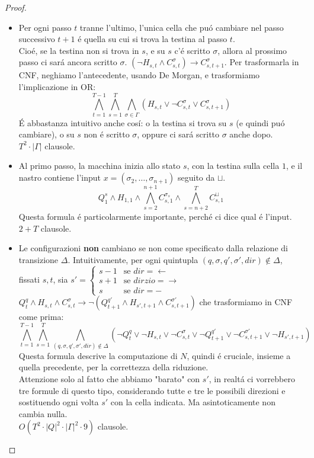 \begin{proof}
\begin{itemize}
    \item Per ogni passo $t$ tranne l'ultimo, l'unica cella che puó cambiare nel passo successivo $t+1$ é quella su cui si trova la testina al passo $t$.\\
    Cioé, se la testina non si trova in $s$, e su $s$ c'é scritto $\sigma$, allora al prossimo passo ci sará ancora scritto $\sigma$.
    $(\neg H_{s,t} \land C_{s,t}^\sigma) \rightarrow C_{s,t+1}^\sigma$. 
    Per trasformarla in CNF, neghiamo l'antecedente, usando De Morgan, e trasformiamo l'implicazione in OR:
    \[
    \bigwedge_{t=1}^{T-1} \bigwedge_{s=1}^{T} \bigwedge_{\sigma \in \Gamma} \left( H_{s,t} \lor \neg C_{s,t}^\sigma \lor C_{s,t+1}^\sigma \right)
    \]
    É abbastanza intuitivo anche cosí: o la testina si trova su $s$ (e quindi puó cambiare), o su $s$ non é scritto $\sigma$, oppure ci sará scritto $\sigma$ anche dopo.\\
    $T^2 \cdot |\Gamma|$ clausole.\\

    \item Al primo passo, la macchina inizia allo stato $s$, con la testina sulla cella $1$, e il nastro contiene l'input $x = (\sigma_2, \dots, \sigma_{n+1})$ seguito da ${\sqcup}$.
    \[
    Q_1^s \land H_{1,1} \land \bigwedge_{s=2}^{n+1} C_{s, 1}^{\sigma_{s}} \land \bigwedge_{s=n+2}^{T} C_{s, 1}^{\sqcup}
    \]
    Questa formula é particolarmente importante, perché ci dice qual é l'input.\\
    $2 + T$ clausole.\\
    
    \item Le configurazioni \textbf{non} cambiano se non come specificato dalla relazione di transizione $\Delta$.
    Intuitivamente, per ogni quintupla $(q, \sigma, q', \sigma', dir) \notin \Delta$, fissati $s, t$, sia 
    $s' = \begin{cases}
        s-1 & \text{se } dir = \leftarrow \\
        s+1 & \text{se } dir zio= \rightarrow\\
        s & \text{se } dir = -
    \end{cases}$\\
    $Q_t^q \land H_{s,t} \land C_{s,t}^\sigma \rightarrow \neg (Q_{t+1}^{q'} \land H_{s',t+1} \land  C_{s,t+1}^{\sigma'})$
    che trasformiamo in CNF come prima:
    \[
    \bigwedge_{t=1}^{T-1} \bigwedge_{s=1}^{T} \bigwedge_{(q, \sigma, q', \sigma', dir) \notin \Delta} \left( \neg Q_t^q \lor \neg H_{s,t} \lor \neg C_{s,t}^\sigma \lor \neg Q_{t+1}^{q'} \lor \neg C_{s,t+1}^{\sigma'} \lor \neg H_{s',t+1} \right)
    \]
    Questa formula descrive la computazione di $N$, quindi é cruciale, insieme a quella precedente, per la correttezza della riduzione.\\
    Attenzione solo al fatto che abbiamo "barato" con $s'$, in realtá ci vorrebbero tre formule di questo tipo,
    considerando tutte e tre le possibili direzioni e sostituendo ogni volta $s'$ con la cella indicata.
    Ma asintoticamente non cambia nulla.\\
    $O(T^2 \cdot |Q|^2 \cdot |\Gamma|^2 \cdot 9)$ clausole.\\


\end{itemize}
\end{proof}
